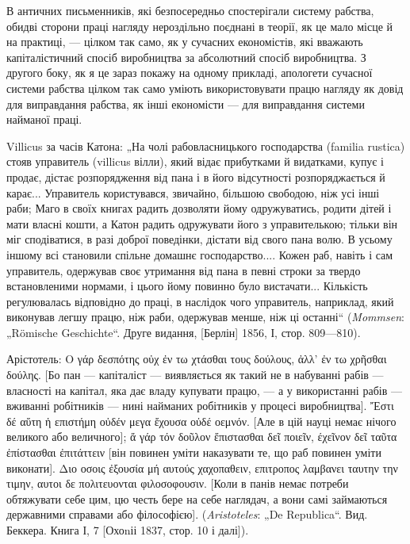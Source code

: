 В античних письменників, які безпосередньо спостерігали
систему рабства, обидві сторони праці нагляду нероздільно поєднані
в теорії, як це мало місце й на практиці, — цілком так
само, як у сучасних економістів, які вважають капіталістичний
спосіб виробництва за абсолютний спосіб виробництва. З другого
боку, як я це зараз покажу на одному прикладі, апологети
сучасної системи рабства цілком так само уміють використовувати
працю нагляду як довід для виправдання рабства, як інші
економісти — для виправдання системи найманої праці.

Villicus за часів Катона: „На чолі рабовласницького господарства
(familia rustica) стояв управитель (villicus вілли), який відає
прибутками й видатками, купує і продає, дістає розпорядження
від пана і в його відсутності розпоряджається й карає...
Управитель користувався, звичайно, більшою свободою, ніж
усі інші раби; Маго в своїх книгах радить дозволяти йому одружуватись,
родити дітей і мати власні кошти, а Катон радить
одружувати його з управителькою; тільки він міг сподіватися,
в разі доброї поведінки, дістати від свого пана волю. В усьому
іншому всі становили спільне домашнє господарство.... Кожен
раб, навіть і сам управитель, одержував своє утримання від
пана в певні строки за твердо встановленими нормами, і цього
йому повинно було вистачати... Кількість регулювалась відповідно
до праці, в наслідок чого управитель, наприклад, який
виконував легшу працю, ніж раби, одержував менше, ніж ці
останні“ (\emph{Mommsen}: „Römische Geschichte“. Друге видання, [Берлін]
1856, І, стор. 809—810).

Арістотель: \textgreek{Ο γάρ δεσπότης οὐχ ἐν τω  χτάσθαι τους δούλους, ἀλλ’ ἐν τω
χρῆσθαι δούλης}. [Бо пан — капіталіст — виявляється як такий не в
набуванні рабів — власності на капітал, яка дає владу купувати
працю, — а у використанні рабів — вживанні робітників — нині
найманих робітників у процесі виробництва]. \textgreek{Ἔστι δέ αὕτη ἡ επιστήμη
οὐδέν μεγα ἔχουσα οὐδέ οεμνόν}. [Але в цій науці немає нічого великого
або величного]; \textgreek{ἄ γάρ τόν δοῦλον ἔπιστασθαι δεῖ ποιεῖν, έχεῖνον δεῖ
ταῦτα ἐπίστασθαι ἐπιτάττειν} [він повинен уміти наказувати те, що раб
повинен уміти виконати]. \textgreek{Διο οσοις ἐξουσία μή αυτούς χαχοπαθειν, επιτροπος
λαμβανει ταυτην την τιμην, αυτοι δε πολιτευονται φιλοσοφουσιν}.
[Коли в панів немає потреби обтяжувати себе цим, цю честь
бере на себе наглядач, а вони самі займаються державними
справами або філософією]. (\emph{Aristoteles}: „De Republica“. Вид.
Беккера. Книга І, 7 [Охоnіі 1837, стор. 10 і далі]).

